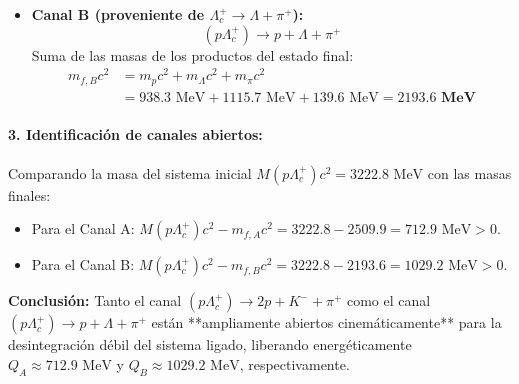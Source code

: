 \begin{problema}
\begin{itemize}
    \item \textbf{Canal B (proveniente de $\Lambda_c^+ \to \Lambda + \pi^+$):}
    \begin{equation*}
    (p \Lambda_c^+) \longrightarrow p + \Lambda + \pi^+
    \end{equation*}
    Suma de las masas de los productos del estado final:
    \begin{align*}
    m_{f,B} c^2 &= m_p c^2 + m_\Lambda c^2 + m_\pi c^2 \\
    &= 938.3\text{ MeV} + 1115.7\text{ MeV} + 139.6\text{ MeV} = \mathbf{2193.6\text{ MeV}}
    \end{align*}
\end{itemize}

\paragraph{3. Identificación de canales abiertos:}
Comparando la masa del sistema inicial $M(p\Lambda_c^+) c^2 = 3222.8\text{ MeV}$ con las masas finales:
\begin{itemize}
    \item Para el Canal A: $M(p\Lambda_c^+) c^2 - m_{f,A} c^2 = 3222.8 - 2509.9 = 712.9\text{ MeV} > 0$.
    \item Para el Canal B: $M(p\Lambda_c^+) c^2 - m_{f,B} c^2 = 3222.8 - 2193.6 = 1029.2\text{ MeV} > 0$.
\end{itemize}

\textbf{Conclusión:} Tanto el canal $(p \Lambda_c^+) \to 2p + K^- + \pi^+$ como el canal $(p \Lambda_c^+) \to p + \Lambda + \pi^+$ están **ampliamente abiertos cinemáticamente** para la desintegración débil del sistema ligado, liberando energéticamente $Q_A \approx 712.9\text{ MeV}$ y $Q_B \approx 1029.2\text{ MeV}$, respectivamente.
\end{problema}


